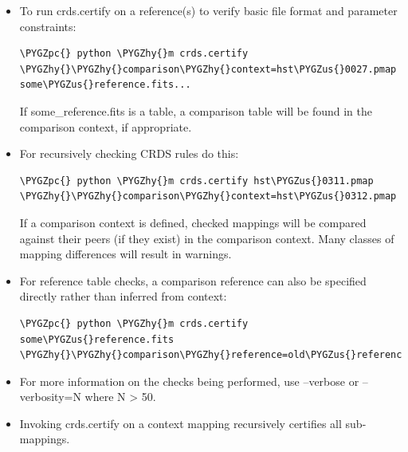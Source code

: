 \documentclass[letterpaper,10pt,english]{sphinxmanual}
\def\PYGZus{\char`\_}
\def\PYGZpc{\char`\%}
\def\PYGZhy{\char`\-}
\begin{document}
\begin{itemize}
\begin{Verbatim}[commandchars=\\\{\}]
\PYGZpc{} python \PYGZhy{}m crds.certify hst.pmap
\end{Verbatim}

\item {} 
To run crds.certify on a reference(s) to verify basic file format and parameter constraints:

\begin{Verbatim}[commandchars=\\\{\}]
\PYGZpc{} python \PYGZhy{}m crds.certify \PYGZhy{}\PYGZhy{}comparison\PYGZhy{}context=hst\PYGZus{}0027.pmap   some\PYGZus{}reference.fits...
\end{Verbatim}

If some\_reference.fits is a table,  a comparison table will be found in the comparison context, if appropriate.

\item {} 
For recursively checking CRDS rules do this:

\begin{Verbatim}[commandchars=\\\{\}]
\PYGZpc{} python \PYGZhy{}m crds.certify hst\PYGZus{}0311.pmap \PYGZhy{}\PYGZhy{}comparison\PYGZhy{}context=hst\PYGZus{}0312.pmap
\end{Verbatim}

If a comparison context is defined, checked mappings will be compared against their peers (if they exist) in
the comparison context.  Many classes of mapping differences will result in warnings.

\item {} 
For reference table checks,  a comparison reference can also be specified directly rather than inferred from context:

\begin{Verbatim}[commandchars=\\\{\}]
\PYGZpc{} python \PYGZhy{}m crds.certify some\PYGZus{}reference.fits \PYGZhy{}\PYGZhy{}comparison\PYGZhy{}reference=old\PYGZus{}reference\PYGZus{}version.fits
\end{Verbatim}

\item {} 
For more information on the checks being performed,  use --verbose or --verbosity=N where N \textgreater{} 50.

\item {} 
Invoking crds.certify on a context mapping recursively certifies all sub-mappings.

\end{itemize}
\end{document}
